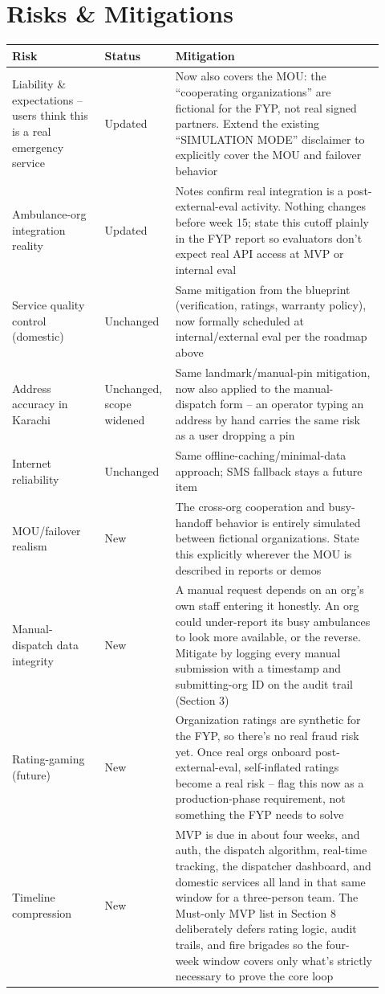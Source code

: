 \documentclass[11pt,a4paper]{article}
\begin{document}
\section{Risks \& Mitigations}

\begin{longtable}{p{0.24\linewidth} p{0.14\linewidth} p{0.54\linewidth}}
\toprule
\textbf{Risk} & \textbf{Status} & \textbf{Mitigation} \\
\midrule
\endhead
Liability \& expectations -- users think this is a real emergency service & Updated & Now also covers the MOU: the ``cooperating organizations'' are fictional for the FYP, not real signed partners. Extend the existing ``SIMULATION MODE'' disclaimer to explicitly cover the MOU and failover behavior \\
\addlinespace
Ambulance-org integration reality & Updated & Notes confirm real integration is a post-external-eval activity. Nothing changes before week 15; state this cutoff plainly in the FYP report so evaluators don't expect real API access at MVP or internal eval \\
\addlinespace
Service quality control (domestic) & Unchanged & Same mitigation from the blueprint (verification, ratings, warranty policy), now formally scheduled at internal/external eval per the roadmap above \\
\addlinespace
Address accuracy in Karachi & Unchanged, scope widened & Same landmark/manual-pin mitigation, now also applied to the manual-dispatch form -- an operator typing an address by hand carries the same risk as a user dropping a pin \\
\addlinespace
Internet reliability & Unchanged & Same offline-caching/minimal-data approach; SMS fallback stays a future item \\
\addlinespace
MOU/failover realism & New & The cross-org cooperation and busy-handoff behavior is entirely simulated between fictional organizations. State this explicitly wherever the MOU is described in reports or demos \\
\addlinespace
Manual-dispatch data integrity & New & A manual request depends on an org's own staff entering it honestly. An org could under-report its busy ambulances to look more available, or the reverse. Mitigate by logging every manual submission with a timestamp and submitting-org ID on the audit trail (Section 3) \\
\addlinespace
Rating-gaming (future) & New & Organization ratings are synthetic for the FYP, so there's no real fraud risk yet. Once real orgs onboard post-external-eval, self-inflated ratings become a real risk -- flag this now as a production-phase requirement, not something the FYP needs to solve \\
\addlinespace
Timeline compression & New & MVP is due in about four weeks, and auth, the dispatch algorithm, real-time tracking, the dispatcher dashboard, and domestic services all land in that same window for a three-person team. The Must-only MVP list in Section 8 deliberately defers rating logic, audit trails, and fire brigades so the four-week window covers only what's strictly necessary to prove the core loop \\
\bottomrule
\end{longtable}
\end{document}
